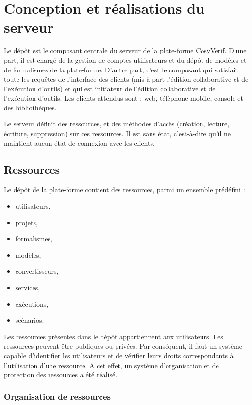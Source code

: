 \documentclass{report}
\begin{document}

\chapter{Conception et réalisations du serveur}

Le dépôt est le composant centrale du serveur de la plate-forme CosyVerif. D'une part, il est chargé de la
gestion de comptes utilisateurs et du dépôt de modèles et de formalismes de
la plate-forme. D'autre part, c'est le composant  qui satisfait toute les
requêtes de l'interface des clients (mis à part l'édition 
collaborative et de l'exécution d'outils) et qui est initiateur de l'édition collaborative et de l'exécution d'outils.
Les clients attendus sont : web, téléphone mobile, console et des bibliothèques.

Le serveur définit des
ressources, et des méthodes d'accès (création, lecture, écriture,
suppression) sur ces ressources. Il est sans état, c'est-à-dire
qu'il ne maintient aucun état de connexion avec les clients.

\section{Ressources}

Le dépôt de la plate-forme contient des ressources, parmi un ensemble
prédéfini :
\begin{itemize}
  \item utilisateurs,
  \item projets,
  \item formalismes,
  \item modèles,
  \item convertisseurs,
  \item services,
  \item exécutions,
  \item scénarios.
\end{itemize}

Les ressources présentes dans le dépôt appartiennent aux utilisateurs.
Les ressources peuvent être publiques ou privées.
Par conséquent, il faut un système capable d'identifier
les utilisateurs et de vérifier leurs droits correspondants à l'utilisation d'une ressource. A cet effet, un système 
d'organisation et de protection des ressources a été réalisé.

\subsection{Organisation de ressources}
\end{document}

